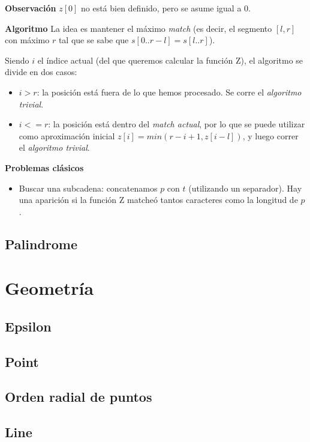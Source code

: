 \textbf{Observación}
$z[0]$ no está bien definido, pero se asume igual a $0$.

\textbf{Algoritmo}
La idea es mantener el máximo \emph{match} (es decir, el segmento $[l, r]$ con
máximo $r$ tal que se sabe que $s[0..r-l] = s[l..r]$). 

Siendo $i$ el índice actual (del que queremos calcular la función Z), el algoritmo 
se divide en dos casos:
\begin{itemize}
    \item $i > r$: la posición está fuera de lo que hemos procesado. Se corre el
    \emph{algoritmo trivial}.
    \item $i <= r$: la posición está dentro del \emph{match actual}, por lo que
    se puede utilizar como aproximación inicial $z[i] = min(r - i + 1, z[i-l])$,
    y luego correr el \emph{algoritmo trivial}.
\end{itemize}

\textbf{Problemas clásicos}
\begin{itemize}
    \item Buscar una subcadena: concatenamos $p$ con $t$ (utilizando un separador).
    Hay una aparición si la función Z matcheó tantos caracteres como la longitud
    de $p$.
\end{itemize}
\subsection{Palindrome}

\section{Geometría}%
\subsection{Epsilon}
\subsection{Point}
\subsection{Orden radial de puntos}
\subsection{Line}
